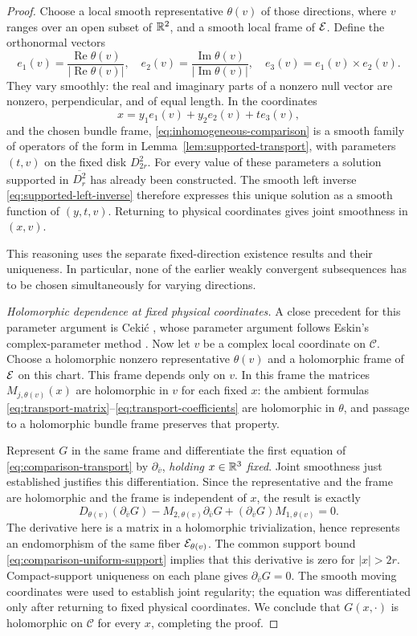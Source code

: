 \begin{proof}
Choose a local smooth representative $\theta(v)$ of those directions,
where $v$ ranges over an open subset of $\mathbb R^2$, and a smooth local
frame of $\mathcal E$. Define the orthonormal vectors
\[
 e_1(v)=\frac{\operatorname{Re}\theta(v)}
                   {|\operatorname{Re}\theta(v)|},
 \quad
 e_2(v)=\frac{\operatorname{Im}\theta(v)}
                   {|\operatorname{Im}\theta(v)|},
 \quad
 e_3(v)=e_1(v)\times e_2(v).
\]
They vary smoothly: the real and imaginary parts of a nonzero null
vector are nonzero, perpendicular, and of equal length. In the
coordinates
\[
 x=y_1e_1(v)+y_2e_2(v)+te_3(v),
\]
and the chosen bundle frame, \eqref{eq:inhomogeneous-comparison}
is a smooth family of operators of the form in
Lemma~\ref{lem:supported-transport}, with parameters $(t,v)$ on
the fixed disk $D_{2r}^2$. For every value of these parameters a
solution supported in $\overline{D_r^2}$ has already been
constructed. The smooth left inverse
\eqref{eq:supported-left-inverse} therefore expresses this unique
solution as a smooth function of $(y,t,v)$. Returning to physical
coordinates gives joint smoothness in $(x,v)$.

This reasoning uses the separate fixed-direction existence results
and their uniqueness. In particular, none of the earlier weakly
convergent subsequences has to be chosen simultaneously for varying
directions.

\emph{Holomorphic dependence at fixed physical coordinates.}
A close precedent for this parameter argument is Ceki\'c
\cite[Theorem~3.4 and Lemma~4.1 in the arXiv version]{Cekic2025}, whose
parameter argument follows Eskin's complex-parameter method \cite{Eskin2001}.
Now let $v$ be a complex local coordinate on $\mathcal C$. Choose
a holomorphic nonzero representative $\theta(v)$ and a holomorphic
frame of $\mathcal E$ on this chart. This frame depends only on $v$.
In this frame the matrices $M_{j,\theta(v)}(x)$ are holomorphic in
$v$ for each fixed $x$: the ambient formulas
\eqref{eq:transport-matrix}--\eqref{eq:transport-coefficients} are
holomorphic in $\theta$, and passage to a holomorphic bundle frame
preserves that property.

Represent $G$ in the same frame and differentiate the first equation
of \eqref{eq:comparison-transport} by $\partial_{\bar v}$,
\emph{holding $x\in\mathbb R^3$ fixed}. Joint smoothness just established
justifies this differentiation. Since the representative and the
frame are holomorphic and the frame is independent of $x$, the
result is exactly
\[
 D_{\theta(v)}(\partial_{\bar v}G)
  -M_{2,\theta(v)}\partial_{\bar v}G
  +(\partial_{\bar v}G)M_{1,\theta(v)}=0.
\]
The derivative here is a matrix in a holomorphic trivialization,
hence represents an endomorphism of the same fiber $\mathcal E_{\theta(v)}$.
The common support bound \eqref{eq:comparison-uniform-support}
implies that this derivative is zero for $|x|>2r$. Compact-support
uniqueness on each plane gives $\partial_{\bar v}G=0$. The smooth
moving coordinates were used to establish joint regularity; the
equation was differentiated only after returning to fixed physical
coordinates. We conclude that $G(x,\cdot)$ is holomorphic on
$\mathcal C$ for every $x$, completing the proof.
\end{proof}
